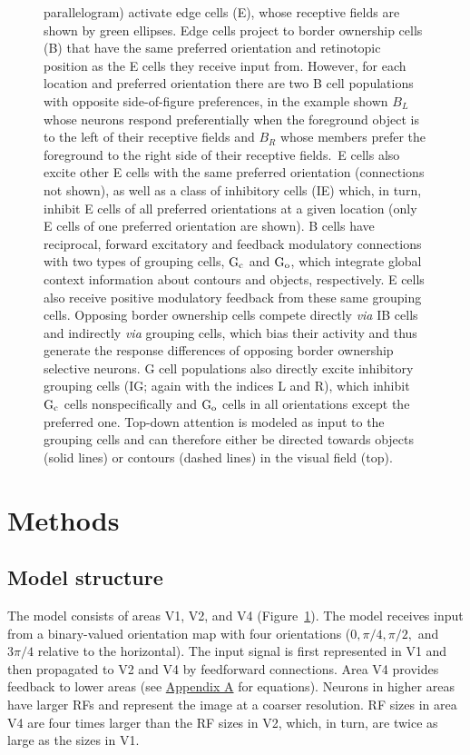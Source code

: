 \begin{figure}[t!]
{{parallelogram) activate edge cells (E), whose receptive fields are   shown by green ellipses. Edge cells project to border ownership cells (B) that have the same preferred orientation and retinotopic position as the E cells they receive input from. However, for each location and preferred orientation there are two B cell populations with opposite side-of-figure preferences, in the example shown $B_{L}$ whose neurons respond preferentially when the foreground object is to the left of their receptive fields and $B_{R}$ whose members prefer the foreground to the right side of their receptive fields.\ E cells also excite other E cells with the same preferred orientation (connections not shown),  as well as a class of inhibitory cells (IE) which, in turn, inhibit E cells of all preferred orientations at a given location (only E cells of one preferred orientation are shown). B cells have reciprocal, forward excitatory and feedback modulatory connections with two types of grouping cells, $\rm G_c$ and $\rm G_o$, which integrate global context information about contours and objects, respectively. E cells also receive positive modulatory feedback from these same grouping cells. Opposing border ownership cells compete directly {\em via} IB cells and indirectly {\em via} grouping cells, which bias their activity and thus generate the response differences of opposing border ownership selective neurons. G cell populations also directly excite
inhibitory grouping cells (IG; again with the indices L and R), which inhibit $\rm G_c$ cells nonspecifically and $\rm G_o$ cells in all orientations except the preferred one.}
Top-down attention is modeled as input to the grouping cells and can therefore either be directed towards objects (solid lines) or contours (dashed lines) in the visual field (top).}
\label{Fig:anatomy}
\end{figure}

\section{Methods} 
\label{sec:model}

\subsection{Model structure}

The model consists of areas V1, V2, and V4
(Figure~\ref{Fig:anatomy}). The model receives input from a
binary-valued orientation map with four orientations
($0, \pi/4, \pi/2,$ and $3\pi/4$ relative to the horizontal). The
input signal is first represented in V1 and then propagated to V2 and
V4 by feedforward connections. Area V4 provides feedback to lower
areas (see \hyperref[sec:appendix_eq]{Appendix A} for equations). Neurons in higher
areas have larger RFs and represent the image at a coarser
resolution. RF sizes in area V4 are four times larger than the RF
sizes in V2, which, in turn, are twice as large as the sizes in V1.

